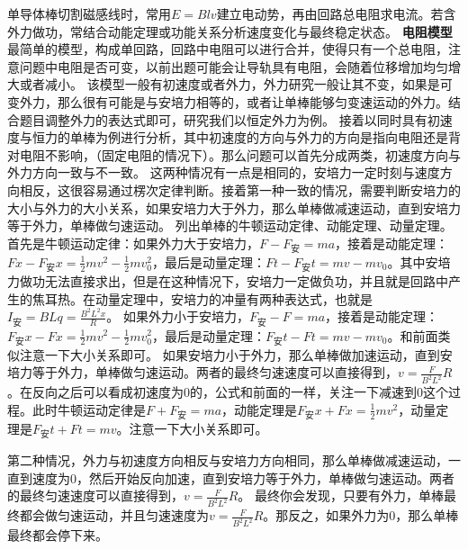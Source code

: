 单导体棒切割磁感线时，常用$E=Blv$建立电动势，再由回路总电阻求电流。若含外力做功，常结合动能定理或功能关系分析速度变化与最终稳定状态。
\textbf{电阻模型}
最简单的模型，构成单回路，回路中电阻可以进行合并，使得只有一个总电阻，注意问题中电阻是否可变，以前出题可能会让导轨具有电阻，会随着位移增加均匀增大或者减小。
该模型一般有初速度或者外力，外力研究一般让其不变，如果是可变外力，那么很有可能是与安培力相等的，或者让单棒能够匀变速运动的外力。结合题目调整外力的表达式即可，研究我们以恒定外力为例。
接着以同时具有初速度与恒力的单棒为例进行分析，其中初速度的方向与外力的方向是指向电阻还是背对电阻不影响，（固定电阻的情况下）。那么问题可以首先分成两类，初速度方向与外力方向一致与不一致。
这两种情况有一点是相同的，安培力一定时刻与速度方向相反，这很容易通过楞次定律判断。接着第一种一致的情况，需要判断安培力的大小与外力的大小关系，如果安培力大于外力，那么单棒做减速运动，直到安培力等于外力，单棒做匀速运动。
列出单棒的牛顿运动定律、动能定理、动量定理。首先是牛顿运动定律：如果外力大于安培力，$F-F_{\text{安}}=ma$，接着是动能定理：$Fx-F_{\text{安}}x=\frac{1}{2}mv^2-\frac{1}{2}mv_0^2$，最后是动量定理：$Ft-F_{\text{安}}t=mv-mv_0$。其中安培力做功无法直接求出，但是在这种情况下，安培力一定做负功，并且就是回路中产生的焦耳热。在动量定理中，安培力的冲量有两种表达式，也就是$I_{\text{安}}=BLq=\frac{B^2L^2x}{R}$。
如果外力小于安培力，$F_{\text{安}}-F=ma$，接着是动能定理：$F_{\text{安}}x-Fx=\frac{1}{2}mv^2-\frac{1}{2}mv_0^2$，最后是动量定理：$F_{\text{安}}t-Ft=mv-mv_0$。和前面类似注意一下大小关系即可。
如果安培力小于外力，那么单棒做加速运动，直到安培力等于外力，单棒做匀速运动。两者的最终匀速速度可以直接得到，$v=\frac{F}{B^2L^2}R$。在反向之后可以看成初速度为0的，公式和前面的一样，关注一下减速到0这个过程。此时牛顿运动定律是$F+F_{\text{安}}=ma$，动能定理是$F_{\text{安}}x+Fx=\frac{1}{2}mv^2$，动量定理是$F_{\text{安}}t+Ft=mv$。注意一下大小关系即可。

第二种情况，外力与初速度方向相反与安培力方向相同，那么单棒做减速运动，一直到速度为0，然后开始反向加速，直到安培力等于外力，单棒做匀速运动。两者的最终匀速速度可以直接得到，$v=\frac{F}{B^2L^2}R$。
最终你会发现，只要有外力，单棒最终都会做匀速运动，并且匀速速度为$v=\frac{F}{B^2L^2}R$。那反之，如果外力为0，那么单棒最终都会停下来。

